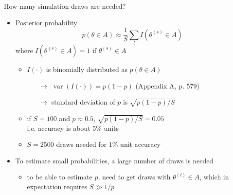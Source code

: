 \documentclass[finnish,english,t]{beamer}
\DeclareMathOperator{\var}{var}
\begin{document}
\begin{frame}{How many simulation draws are needed?}

  \begin{itemize}
  \item Posterior probability
    \begin{equation*}
      p(\theta \in A)\approx \frac{1}{S}\sum_l I(\theta^{(s)} \in A)
    \end{equation*}
    where $I(\theta^{(s)} \in A)=1$ if $\theta^{(s)} \in A$
    \begin{itemize}
    \item $I(\cdot)$ is binomially distributed as $p(\theta \in A)$
        \begin{itemize}
        \item[$\rightarrow$] $\var(I(\cdot)) =  p(1-p)$  (Appendix A, p. 579)
        \item[$\rightarrow$] standard deviation of $p$ is $\sqrt{p(1-p)/S}$
        \end{itemize}
        \pause
      \item if $S=100$ and $p\approx 0.5$, $\sqrt{p(1-p)/S}=0.05$\\
        i.e. accuracy is about $5\%$ units
        \pause
      \item $S=2500$ draws needed for $1\%$ unit accuracy
    \end{itemize}
    \pause
  \item To  estimate small probabilities, a large number of draws is needed
    \begin{itemize}
    \item to be able to estimate $p$, need to get draws with
      $\theta^{(l)} \in A$, which in expectation requires $S \gg 1/p$
    \end{itemize}
\end{itemize}

\end{frame}
\end{document}
